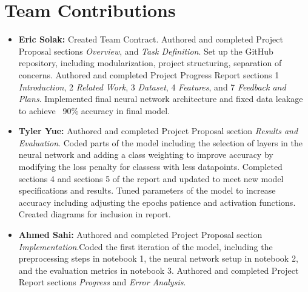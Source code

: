 \documentclass[11pt]{article}
\begin{document}
\section*{Team Contributions}
\begin{itemize}
  \item \textbf{Eric Solak: } Created Team Contract. Authored and completed Project Proposal sections \textit{Overview}, and \textit{Task Definition}. Set up the GitHub repository, including modularization, project structuring, separation of concerns. 
  Authored and completed Project Progress Report sections 1 \textit{Introduction}, 2 \textit{Related Work}, 3 \textit{Dataset}, 4 \textit{Features}, and 7 \textit{Feedback and Plans}. Implemented final neural network architecture
  and fixed data leakage to achieve ~90\% accuracy in final model.
  \item \textbf{Tyler Yue: } Authored and completed Project Proposal section \textit{Results and Evaluation}. Coded parts of the model including the selection of layers in the neural network and adding a class weighting to improve accuracy by modifying the loss penalty for classess with less datapoints. Completed sections 4 and sections 5 of the report and updated to meet new model specifications and results. Tuned parameters of the model to increase accuracy including adjusting the epochs patience and activation functions. Created diagrams for inclusion in report. 
  \item \textbf{Ahmed Sahi: } Authored and completed Project Proposal section \textit{Implementation}.Coded the first iteration of the model, including the preprocessing steps in notebook 1, the neural network setup in notebook 2, and the evaluation metrics in notebook 3. Authored and completed Project Report sections \textit{Progress} and \textit{Error Analysis}.
\end{itemize}
%





\end{document}
